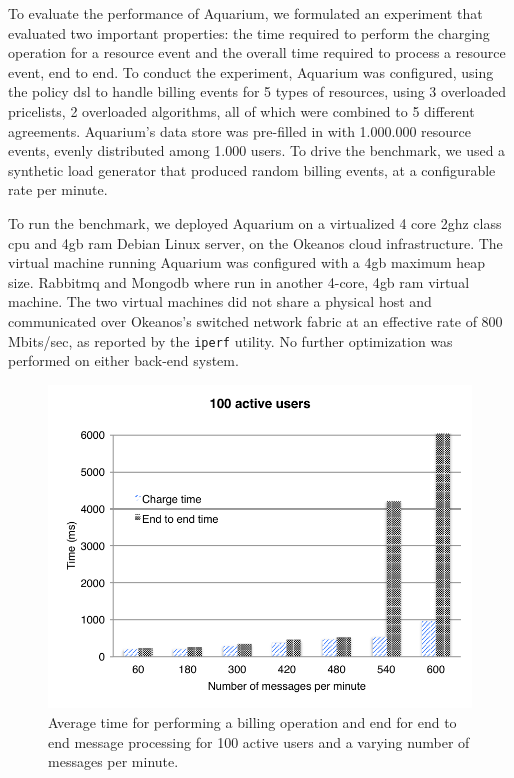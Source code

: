 \documentclass[letterpaper,twocolumn,10pt]{article}
\begin{document}
To evaluate the performance of Aquarium, we formulated an experiment
that evaluated two important properties: the time required to perform
the charging operation for a resource event and the overall time
required to process a resource event, end to end. To conduct the
experiment, Aquarium was configured, using the policy {\sc dsl} to
handle billing events for 5 types of resources, using 3 overloaded
pricelists, 2 overloaded algorithms, all of which were combined to 5
different agreements. Aquarium's data store was pre-filled in with
1.000.000 resource events, evenly distributed among 1.000 users. To
drive the benchmark, we used a synthetic load generator that produced
random billing events, at a configurable rate per minute.

To run the benchmark, we deployed Aquarium on a virtualized 4 core 2{\sc gh}z
class {\sc cpu} and 4{\sc gb} {\sc ram} Debian Linux server, on the Okeanos
cloud infrastructure. The virtual machine running Aquarium was configured with
a 4{\sc gb} maximum heap size.  Rabbit{\sc mq} and Mongo{\sc db} where run in
another 4-core, 4{\sc gb ram} virtual machine. The two virtual machines did not
share a physical host and communicated over Okeanos's switched network fabric
at an effective rate of 800 Mbits/sec, as reported by the \texttt{iperf}
utility. No
further optimization was performed on either back-end system.

\begin{figure}[t]
    \begin{center}
        \includegraphics[scale=0.59]{perf.pdf}
    \end{center}

    \caption{Average time for performing a billing operation and end
      for end to end message processing for 100 active users and a
      varying number of messages per minute.}
    
    \label{fig:perf}
\end{figure}
\end{document}
